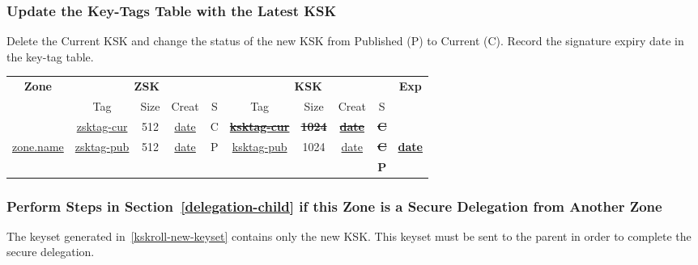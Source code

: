 



\label{kskroll-new-keyset}


\subsubsection{Update the Key-Tags Table with the Latest KSK}

Delete the Current KSK and change the status of the new KSK from Published
(P) to Current (C).  Record the signature expiry date in the key-tag table.

\begin{center}
\begin{tabular}{|c|c|c|c|c|c|c|c|c|c|}
\hline
{\bf Zone} &
\multicolumn{4}{c|}{{\bf ZSK}} &
\multicolumn{4}{c|}{{\bf KSK}} &
{\bf Exp} \\
\cline{2-9}

 & Tag & Size & Creat & S & Tag & Size & Creat & S & \\
\hline

					&
\underline{zsktag-cur}			&
512					&
\underline{date}			&
C					&
{\bf \sout{\underline{ksktag-cur}}}	&
{\bf \sout{1024}}			&
{\bf \sout{\underline{date}}}		&
{\bf \sout{C}}				&
					\\

\cline{2-9}

\underline{zone.name}	&
\underline{zsktag-pub}	&
512			&
\underline{date}	&
P			&
\underline{ksktag-pub}	&
1024			&
\underline{date}	&
{\bf \sout{C}}		&
{\bf\underline{date}}	\\

			&
			&
			&
			&
			&
			&
			&
			&
{\bf P}			&
			\\

\hline
\end{tabular}
\end{center}


\subsubsection{Perform Steps in Section~\ref{delegation-child} if this Zone
is a Secure Delegation from Another Zone}

The keyset generated in~\ref{kskroll-new-keyset} contains only the new KSK.
This keyset must be sent to the parent in order to complete the secure
delegation.




